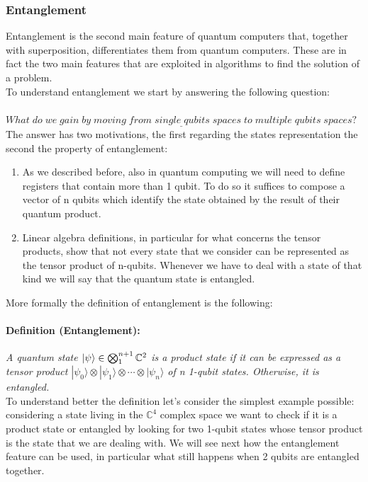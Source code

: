 \documentclass[english]{article}
\newcommand{\sbigotimes}{%
	\mathop{\mathchoice{\textstyle\bigotimes}{\bigotimes}{\bigotimes}{\bigotimes}}%
}
\begin{document}
			\subsubsection{Entanglement}
			\label{sec:entanglement}
				Entanglement is the second main feature of quantum computers that, together with superposition, differentiates them from quantum computers. These are in fact the two main features that are exploited in algorithms to find the solution of a problem. \\
				
				To understand entanglement we start by answering the following question: \\ \\				
				$\underline{What \; do \; we \; gain \; by \; moving \; from \; single \; qubits \; spaces \; to \; multiple \; qubits \; spaces?}$ \\
				
				The answer has two motivations, the first regarding the states representation the second the property of entanglement:
				\begin{enumerate}[label=(\roman*)]
					\item As we described before, also in quantum computing we will need to define registers that contain more than 1 qubit. To do so it suffices to compose a vector of n qubits which identify the state obtained by the result of their quantum product.
					
					\item Linear algebra definitions, in particular for what concerns the tensor products, show that not every state that we consider can be represented as the tensor product of n-qubits. Whenever we have to deal with a state of that kind we will say that the quantum state is entangled.
				\end{enumerate}
			
				More formally the definition of entanglement is the following:
				
				\paragraph{Definition (Entanglement):} \emph{A quantum state $|\psi\rangle \in \sbigotimes_1^{n+1} \mathbb{C}^{2}$ is a product state if it can be expressed as a tensor product $|\psi_0\rangle \otimes |\psi_1\rangle \otimes \cdots \otimes |\psi_n\rangle$ of n 1-qubit states. Otherwise, it is entangled.} \\
				
				To understand better the definition let's consider the simplest example possible: considering a state living in the $\mathbb{C}^4$ complex space we want to check if it is a product state or entangled by looking for two 1-qubit states whose tensor product is the state that we are dealing with. We will see next how the entanglement feature can be used, in particular what still happens when 2 qubits are entangled together.
				
\end{document}
